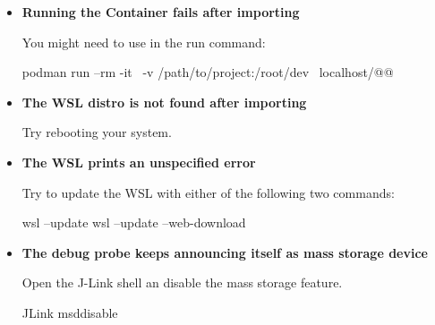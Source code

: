 \begin{itemize}
  \item {\bf Running the Container fails after importing}

    You might need to use  in the run command:
  \begin{monobox}
podman run --rm -it \
-v /path/to/project:/root/dev \
localhost/@\imagename{}@
\end{monobox}
  \item {\bf The WSL distro is not found after importing}

    Try rebooting your system.
  \item {\bf The WSL prints an unspecified error}

    Try to update the WSL with either of the following two commands:
  \begin{monobox}
wsl --update
wsl --update --web-download
\end{monobox}
  \item {\bf The debug probe keeps announcing itself as mass storage device}

    Open the J-Link shell an disable the mass storage feature.
  \begin{monobox}
JLink
msddisable
\end{monobox}
\end{itemize}
